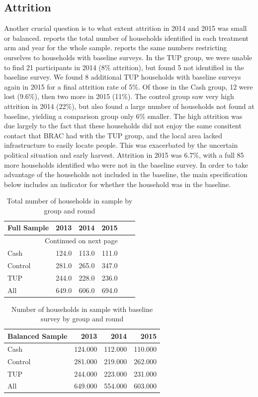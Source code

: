 \documentclass[12pt,article]{article}
\begin{document}
\subsection{Attrition}
\label{sec-3-2}

Another crucial question is to what extent attrition in 2014 and 2015 was small or
balanced.  reports the total number of households identified in
each treatment arm and year for the whole sample. 
reports the same numbers restricting ourselves to households with baseline surveys.
In the TUP group, we were unable to find 21 participants in 2014 (8\% attrition), but
found 5 not identified in the baseline survey. We found 8 additional TUP households
with baseline surveys again in 2015 for a final attrition rate of 5\%. Of those in the
Cash group, 12 were lost (9.6\%), then two more in 2015 (11\%). The control group saw
very high attrition in 2014 (22\%), but also found a large number of households not
found at baseline, yielding a comparison group only 6\% smaller. The high attrition
was due largely to the fact that these households did not enjoy the same consitent
contact that BRAC had with the TUP group, and the local area lacked infrastructure to
easily locate people. This was exacerbated by the uncertain political situation and
early harvest. Attrition in 2015 was 6.7\%, with a full 85 more households identified
who were not in the baseline survey. In order to take advantage of the households not
included in the baseline, the main specification below includes an indicator for
whether the household was in the baseline.


\newpage

\begin{longtable}{lrrrrr}
\caption{\label{tab:attrition_count}Total number of households in sample by group and round}
\\
\hline
Full Sample & 2013 & 2014 & 2015\\
\hline
\endhead
\hline\multicolumn{4}{r}{Continued on next page} \\
\endfoot
\endlastfoot
Cash & 124.0 & 113.0 & 111.0\\
Control & 281.0 & 265.0 & 347.0\\
TUP & 244.0 & 228.0 & 236.0\\
\hline
All & 649.0 & 606.0 & 694.0\\
\hline
\end{longtable}

\begin{table}[htb]
\caption{\label{tab:attrition_balanced_count}Number of households in sample with baseline survey by group and round}
\centering
\begin{tabular}{lrrr}
\hline
Balanced Sample & 2013 & 2014 & 2015\\
\hline
Cash & 124.000 & 112.000 & 110.000\\
Control & 281.000 & 219.000 & 262.000\\
TUP & 244.000 & 223.000 & 231.000\\
\hline
All & 649.000 & 554.000 & 603.000\\
\hline
\end{tabular}
\end{table}
\end{document}
